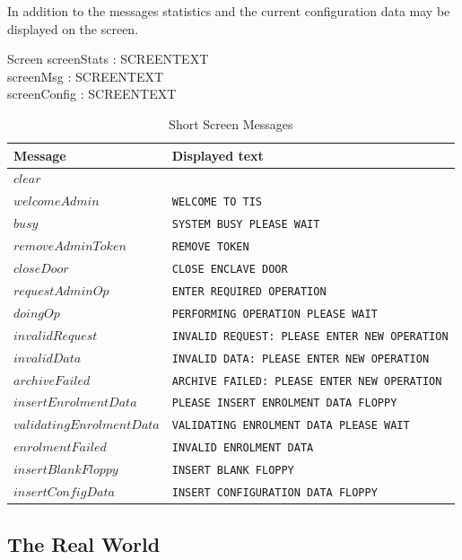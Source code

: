 In addition to the messages statistics and the current configuration
data may be displayed on the screen.

\begin{schema}{Screen}
        screenStats : SCREENTEXT
\\      screenMsg : SCREENTEXT
\\      screenConfig : SCREENTEXT 
\end{schema}

\begin{table}[h]
\begin{tabular}{|l|l|}
{\bf Message}   &  {\bf Displayed text}   \\
\hline
$clear$                 &                               \\
$welcomeAdmin$          & {\tt WELCOME TO TIS}          \\
$busy$                  & {\tt SYSTEM BUSY PLEASE WAIT} \\ 
$removeAdminToken$      & {\tt REMOVE TOKEN} \\
$closeDoor$             & {\tt CLOSE ENCLAVE DOOR} \\
$requestAdminOp$        & {\tt ENTER REQUIRED OPERATION} \\
$doingOp$               & {\tt PERFORMING OPERATION PLEASE WAIT} \\
$invalidRequest$        & {\tt INVALID REQUEST: PLEASE ENTER NEW
OPERATION} \\
$invalidData$           & {\tt INVALID DATA: PLEASE ENTER NEW
OPERATION} \\
$archiveFailed$         & {\tt ARCHIVE FAILED: PLEASE ENTER NEW
OPERATION} \\
$insertEnrolmentData$   & {\tt PLEASE INSERT ENROLMENT DATA FLOPPY} \\
$validatingEnrolmentData$ & {\tt VALIDATING ENROLMENT DATA PLEASE WAIT
} \\
$enrolmentFailed$       & {\tt INVALID ENROLMENT DATA} \\
$insertBlankFloppy$     & {\tt INSERT BLANK FLOPPY} \\
$insertConfigData$      & {\tt INSERT CONFIGURATION DATA FLOPPY} \\
\hline
\end{tabular}
\caption{Short Screen Messages}
\label{tab:screen}
\end{table}

\subsection{The Real World}

